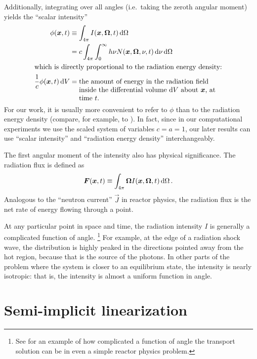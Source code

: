 Additionally, integrating over all angles (i.e.~taking the zeroth angular
moment) yields the ``scalar intensity''
\begin{align} \label{eq:intensityZeroth}
  \phi(\vec{x},t) &\equiv \int_{4\pi} I(\vec{x},\vec{\Omega}, t) \ud \Omega
  \\
  &= c \int_{4\pi} \int_0^\infty h\nu N(\vec{x},\vec{\Omega},\nu, t) \ud\nu
   \ud \Omega
\\ \intertext{which is directly proportional to the radiation energy density:}
\nonumber
\frac{1}{c} \phi(\vec{x},t) \ud V
&= \topbox{the amount of energy in the radiation field inside the differential
  volume $\ud V$ about $\vec{x}$, at time $t$.}
\end{align}
For our work, it is usually more convenient to refer to $\phi$ than to the
radiation energy density (compare, for example, \cite{Den2007} to
\cite{Kno1999a}). In fact, since in our computational experiments we use the
scaled system of variables $c=a=1$, our later results can use ``scalar
intensity'' and ``radiation energy density'' interchangeably.

The first angular moment of the intensity also has physical significance. The
radiation flux is defined as
\begin{equation} \label{eq:intensityFirst}
  \bm{F}(\bm{x},t) \equiv \int_{4\pi} \bm{\Omega}
  I(\bm{x},\bm{\Omega}, t) \mathop{}\!\mathrm{d} \Omega \,.
\end{equation}
Analogous to the ``neutron current'' $\vec{J}$ in reactor physics, the
radiation flux is the net rate of energy flowing through a point.

At any particular point in space and time, the radiation intensity $I$ is
generally a complicated function of angle.%
\footnote{See \cite{Ada2001a} for an example of how complicated a function of
angle the transport solution can be in even a simple reactor physics problem.}
For example, at the edge of a
radiation shock wave, the distribution is highly peaked in the directions
pointed away from the hot region, because that is the source of the photons. In
other parts of the problem where the system is closer to an equilibrium state,
the intensity is nearly isotropic: that is, the intensity is almost a uniform
function in angle.

\section{Semi-implicit linearization}\label{sec:bgSemiImplicit}

